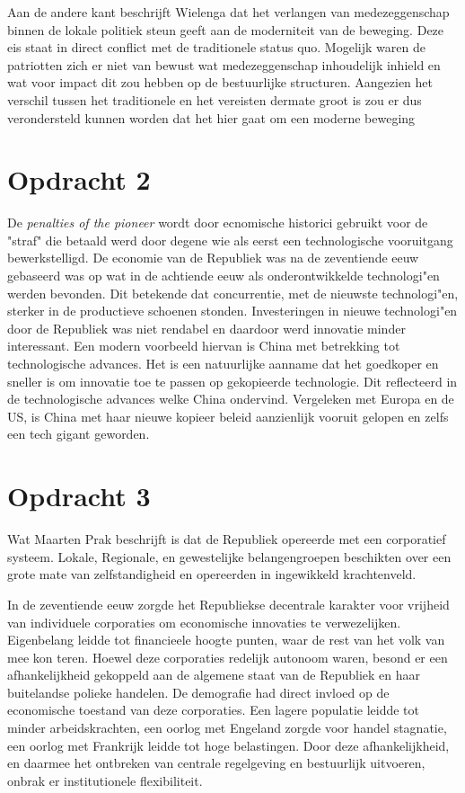 \documentclass[11pt]{amsart}
\begin{document}
Aan de andere kant beschrijft Wielenga dat het verlangen van medezeggenschap binnen de lokale politiek steun geeft aan de moderniteit van de beweging. \autocite[182]{wielengaGeschiedenisVanNederland2022} 
Deze eis staat in direct conflict met de traditionele status quo.
Mogelijk waren de patriotten zich er niet van bewust wat medezeggenschap inhoudelijk inhield en wat voor impact dit zou hebben op de bestuurlijke structuren. Aangezien het verschil tussen het traditionele en het vereisten dermate groot is zou er dus verondersteld kunnen worden dat het hier gaat om een moderne beweging

\section*{Opdracht 2}
De \textit{penalties of the pioneer} wordt door ecnomische historici gebruikt voor de "straf" die betaald werd door degene wie als eerst een technologische vooruitgang bewerkstelligd. De economie van de Republiek  was na de zeventiende eeuw gebaseerd was op wat in de achtiende eeuw als onderontwikkelde technologi"en werden bevonden. Dit betekende dat concurrentie, met de nieuwste technologi"en, sterker in de productieve schoenen stonden. Investeringen in nieuwe technologi"en door de Republiek was niet rendabel en daardoor werd innovatie minder interessant.\autocite[187]{wielengaGeschiedenisVanNederland2022}
Een modern voorbeeld hiervan is China met betrekking tot technologische advances. Het is een natuurlijke aanname dat het goedkoper en sneller is om innovatie toe te passen op gekopieerde technologie. Dit reflecteerd in de technologische advances welke China ondervind. Vergeleken met Europa en de US, is China met haar nieuwe kopieer beleid aanzienlijk vooruit gelopen en zelfs een tech gigant geworden.

\section*{Opdracht 3}
Wat Maarten Prak beschrijft is dat de Republiek opereerde met een corporatief systeem. Lokale, Regionale, en gewestelijke belangengroepen beschikten over een grote mate van zelfstandigheid en opereerden in ingewikkeld krachtenveld.\autocite[188]{wielengaGeschiedenisVanNederland2022}

In de zeventiende eeuw zorgde het Republiekse decentrale karakter voor vrijheid van individuele corporaties om economische innovaties te verwezelijken. Eigenbelang leidde tot financieele hoogte punten, waar de rest van het volk van mee kon teren. Hoewel deze corporaties redelijk autonoom waren, besond er een afhankelijkheid gekoppeld aan de algemene staat van de Republiek en haar buitelandse polieke handelen. De demografie had direct invloed op de economische toestand van deze corporaties. Een lagere populatie leidde tot minder arbeidskrachten, een oorlog met Engeland zorgde voor handel stagnatie, een oorlog met Frankrijk leidde tot hoge belastingen. Door deze afhankelijkheid, en daarmee het ontbreken van centrale regelgeving en bestuurlijk uitvoeren, onbrak er institutionele flexibiliteit. 
\end{document}
